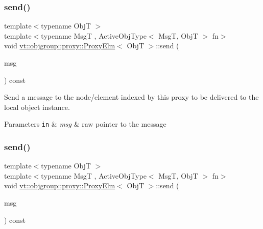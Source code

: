 \mbox{\label{structvt_1_1objgroup_1_1proxy_1_1_proxy_elm_a64d85f6d2721f2001e1e9ecb910e34f9}} 
\subsubsection{\texorpdfstring{send()}{send()}\hspace{0.1cm}{\footnotesize\ttfamily [1/3]}}
{\footnotesize\ttfamily template$<$typename ObjT $>$ \\
template$<$typename MsgT , Active\+Obj\+Type$<$ Msg\+T, Obj\+T $>$ fn$>$ \\
void \hyperlink{structvt_1_1objgroup_1_1proxy_1_1_proxy_elm}{vt\+::objgroup\+::proxy\+::\+Proxy\+Elm}$<$ ObjT $>$\+::send (\begin{DoxyParamCaption}\item[{MsgT $\ast$}]{msg }\end{DoxyParamCaption}) const}



Send a message to the node/element indexed by this proxy to be delivered to the local object instance. 


\begin{DoxyParams}[1]{Parameters}
\mbox{\tt in}  & {\em msg} & raw pointer to the message \\
\hline
\end{DoxyParams}
\mbox{\label{structvt_1_1objgroup_1_1proxy_1_1_proxy_elm_ab3d1751dac7c003cd13306277c164247}} 
\subsubsection{\texorpdfstring{send()}{send()}\hspace{0.1cm}{\footnotesize\ttfamily [2/3]}}
{\footnotesize\ttfamily template$<$typename ObjT $>$ \\
template$<$typename MsgT , Active\+Obj\+Type$<$ Msg\+T, Obj\+T $>$ fn$>$ \\
void \hyperlink{structvt_1_1objgroup_1_1proxy_1_1_proxy_elm}{vt\+::objgroup\+::proxy\+::\+Proxy\+Elm}$<$ ObjT $>$\+::send (\begin{DoxyParamCaption}\item[{\hyperlink{namespacevt_ab2b3d506ec8e8d1540aede826d84a239}{Msg\+Shared\+Ptr}$<$ MsgT $>$}]{msg }\end{DoxyParamCaption}) const}



